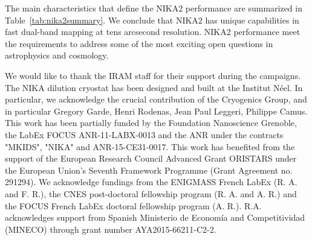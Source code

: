 \documentclass[traditionalabstract]{aa}
\begin{document}
The main characteristics that define the NIKA2 performance are
summarized in Table~\ref{tab:nika2summary}.
We conclude that NIKA2 has unique capabilities in fast dual-band
mapping at tens arcsecond resolution. NIKA2 performance meet the
requirements to address some of the most exciting open questions in
astrophysics and cosmology. 



%


\begin{acknowledgements}
  We would like to thank the IRAM staff for their support during the campaigns. 
  The NIKA dilution cryostat has been designed and built at the Institut N\'eel. 
  In particular, we acknowledge the crucial contribution of the Cryogenics Group, and 
  in particular Gregory Garde, Henri Rodenas, Jean Paul Leggeri, Philippe Camus. 
  This work has been partially funded by the Foundation Nanoscience
  Grenoble, the LabEx FOCUS ANR-11-LABX-0013 and the ANR under the
  contracts "MKIDS", "NIKA" and ANR-15-CE31-0017. This work has
  benefited from the support of the European Research Council Advanced
  Grant ORISTARS under the European Union's Seventh Framework
 Programme (Grant Agreement no. 291294). We acknowledge fundings from
  the ENIGMASS French LabEx (R. A. and F. R.), the CNES post-doctoral
  fellowship program (R. A. and A. R.) and the FOCUS French LabEx
  doctoral fellowship program (A. R.). R.A. acknowledges support from
  Spanish Ministerio de Econom\'ia and Competitividad (MINECO) through
  grant number AYA2015-66211-C2-2.
\end{acknowledgements}

%
%
\end{document}
